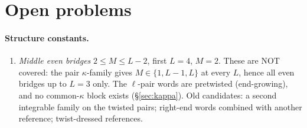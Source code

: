 \section{Open problems}\label{sec:open}

\paragraph{Structure constants.}
\begin{enumerate}
\item \emph{Middle even bridges} $2\le M\le L-2$, first $L=4$, $M=2$. These are NOT covered: the pair $\kappa$-family gives
  $M\in\{1,L-1,L\}$ at every $L$, hence all even bridges up to $L=3$ only. The $\ell$-pair words are pretwisted (end-growing),
  and no common-$\kappa$ block exists (\S\ref{sec:kappa}). Old candidates: a second integrable family on the twisted pairs;
  right-end words combined with another reference; twist-dressed references.


\end{enumerate}
